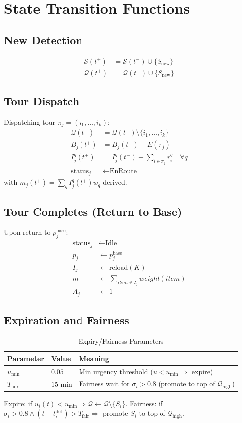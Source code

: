 \documentclass[conference]{IEEEtran}
\begin{document}
\section{State Transition Functions}

\subsection{New Detection}
\begin{align}
\mathcal{S}(t^+) &= \mathcal{S}(t^-) \cup \{S_{\text{new}}\} \\
\mathcal{Q}(t^+) &= \mathcal{Q}(t^-) \cup \{S_{\text{new}}\}
\end{align}

\subsection{Tour Dispatch}
Dispatching tour $\pi_j=(i_1,\dots,i_k)$:
\begin{align}
\mathcal{Q}(t^+) &= \mathcal{Q}(t^-) \setminus \{i_1,\dots,i_k\} \\
B_j(t^+) &= B_j(t^-) - E(\pi_j) \\
I_j^{q}(t^+) &= I_j^{q}(t^-) - \sum_{i\in\pi_j} r_i^q \quad \forall q \\
\text{status}_j &\leftarrow \text{EnRoute}
\end{align}
with $m_j(t^+)=\sum_q I_j^{q}(t^+)w_q$ derived.

\subsection{Tour Completes (Return to Base)}
Upon return to $p_j^{\text{base}}$:
\begin{align}
\text{status}_j &\leftarrow \text{Idle} \\
p_j &\leftarrow p_j^{\text{base}} \\
I_j &\leftarrow \text{reload}(K) \\
m &\leftarrow \sum_{item\in I_j} weight(item) \\
A_j &\leftarrow 1
\end{align}

\subsection{Expiration and Fairness}
\begin{table}[h]
\centering
\caption{Expiry/Fairness Parameters}
\label{tab:expiry}
\begin{tabular}{lll}
\toprule
\textbf{Parameter} & \textbf{Value} & \textbf{Meaning} \\
\midrule
$u_{\min}$ & $0.05$ & Min urgency threshold ($u<u_{\min}\Rightarrow$ expire) \\
$T_{\text{fair}}$ & $15$ min & Fairness wait for $\sigma_i>0.8$ (promote to top of $\mathcal{Q}_{\text{high}}$) \\
\bottomrule
\end{tabular}
\end{table}
\noindent Expire: if $u_i(t)<u_{\min}\Rightarrow\mathcal{Q}\leftarrow\mathcal{Q}\setminus\{S_i\}$. Fairness: if $\sigma_i>0.8\land(t-t_i^{\text{det}})>T_{\text{fair}}\Rightarrow$ promote $S_i$ to top of $\mathcal{Q}_{\text{high}}$.
\end{document}
